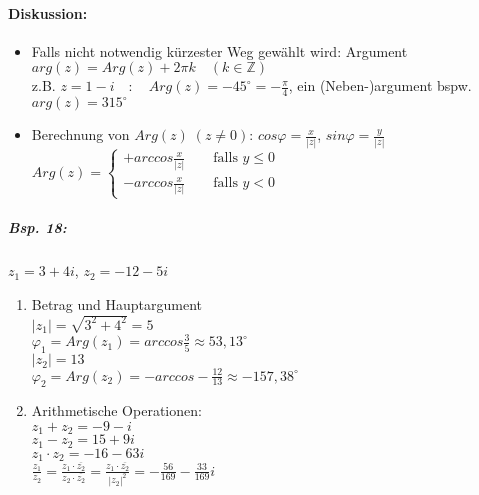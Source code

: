 \paragraph{Diskussion:}
\begin{itemize}
\item Falls nicht notwendig kürzester Weg gewählt wird: Argument $arg(z)= Arg(z) + 2\pi k \quad (k \in \mathbb{Z})$\\
z.B. $z=1-i \quad : \quad Arg(z)=-45^{\circ}=-\frac{\pi}{4}$, ein (Neben-)argument bspw. $arg(z)=315^{\circ}$
\item Berechnung von $Arg(z) \; (z \not = 0)$: $cos \varphi = \frac{x}{|z|}$, $sin\varphi = \frac{y}{|z|}$\\
$\boxed{ Arg (z)= \begin{cases}
+arccos \frac{x}{|z|}\qquad \text{falls } y \leq 0\\
-arccos \frac{x}{|z|} \qquad \text{falls } y < 0
\end{cases}}$
\end{itemize}
\subparagraph{Bsp. 18:} \parskp
$z_1 = 3 + 4i$, $z_2=-12-5i$\\
\begin{enumerate}[label=\alph*.)]
\item Betrag und Hauptargument\\
$|z_1|=\sqrt{3^2+4^2}=5$\\
$\varphi_1 = Arg(z_1) = arccos \frac{3}{5} \approx 53,13 ^{\circ}$\\
$|z_2| = 13$\\
$\varphi_2=Arg(z_2) = - arccos -\frac{12}{13} \approx -157,38 ^{\circ}$
\item Arithmetische Operationen:\\
$z_1 + z_2 = -9 - i$\\
$z_1 - z_2 = 15 + 9 i$\\
$z_1 \cdot z_2 = -16 - 63 i$\\
$\frac{z_1}{z_2}=\frac{z_1 \cdot \overline{z_2}}{z_2 \cdot \overline{z_2}}=\frac{z_1 \cdot \overline{z_2}}{|z_2|^2}=-\frac{56}{169}-\frac{33}{169}i$
\end{enumerate}

